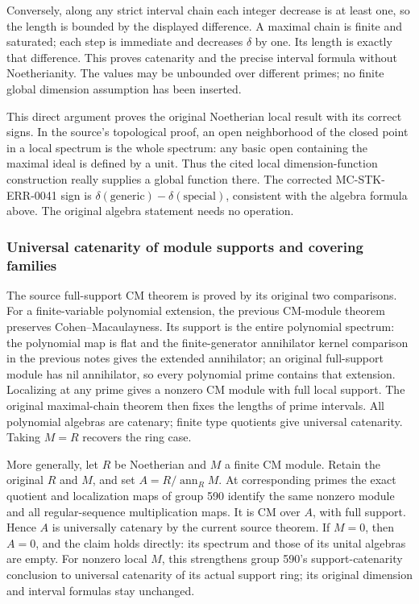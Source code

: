 Conversely, along any strict interval chain each integer decrease is at least one, so the length is bounded by the displayed difference. A maximal chain is finite and saturated; each step is immediate and decreases \(\delta\) by one. Its length is exactly that difference. This proves catenarity and the precise interval formula without Noetherianity. The values may be unbounded over different primes; no finite global dimension assumption has been inserted.

This direct argument proves the original Noetherian local result with its correct signs. In the source's topological proof, an open neighborhood of the closed point in a local spectrum is the whole spectrum: any basic open containing the maximal ideal is defined by a unit. Thus the cited local dimension-function construction really supplies a global function there. The corrected MC-STK-ERR-0041 sign is \(\delta(\text{generic})-\delta(\text{special})\), consistent with the algebra formula above. The original algebra statement needs no operation.

\subsubsection{Universal catenarity of module supports and covering families}\label{algebra-proof-020-universal-catenarity-of-module-supports-and-covering-families}

The source full-support CM theorem is proved by its original two comparisons. For a finite-variable polynomial extension, the previous CM-module theorem preserves Cohen--Macaulayness. Its support is the entire polynomial spectrum: the polynomial map is flat and the finite-generator annihilator kernel comparison in the previous notes gives the extended annihilator; an original full-support module has nil annihilator, so every polynomial prime contains that extension. Localizing at any prime gives a nonzero CM module with full local support. The original maximal-chain theorem then fixes the lengths of prime intervals. All polynomial algebras are catenary; finite type quotients give universal catenarity. Taking \(M=R\) recovers the ring case.

More generally, let \(R\) be Noetherian and \(M\) a finite CM module. Retain the original \(R\) and \(M\), and set \(A=R/\operatorname{ann}_R M\). At corresponding primes the exact quotient and localization maps of group 590 identify the same nonzero module and all regular-sequence multiplication maps. It is CM over \(A\), with full support. Hence \(A\) is universally catenary by the current source theorem. If \(M=0\), then \(A=0\), and the claim holds directly: its spectrum and those of its unital algebras are empty. For nonzero local \(M\), this strengthens group 590's support-catenarity conclusion to universal catenarity of its actual support ring; its original dimension and interval formulas stay unchanged.

